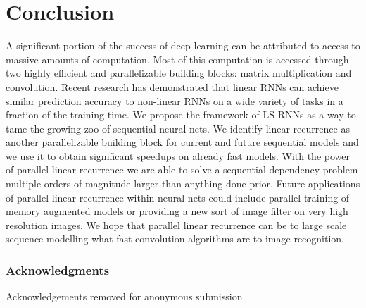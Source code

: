 \documentclass{article}
\begin{document}
\section{Conclusion}
A significant portion of the success of deep learning can be attributed to access to massive
amounts of computation. Most of this computation is accessed through two
highly efficient and parallelizable building blocks:
matrix multiplication and convolution. Recent research has demonstrated that
linear RNNs can achieve similar prediction accuracy to non-linear RNNs on a wide
variety of tasks in a fraction of the training time. We propose the framework of
LS-RNNs as a way to tame the growing zoo of sequential neural nets. We identify linear
recurrence as another parallelizable building block for current and future sequential models
and we use it to obtain significant speedups on already fast models.
With the power of parallel
linear recurrence we are able to solve a sequential dependency problem multiple
orders of magnitude larger than anything done prior.
Future applications of parallel linear recurrence within neural nets could include
parallel training of memory augmented models or providing a new sort of image filter
on very high resolution images.
We hope that parallel linear recurrence can be to large scale sequence
modelling what fast convolution algorithms are to image recognition.

\subsubsection*{Acknowledgments}
Acknowledgements removed for anonymous submission.
\end{document}

